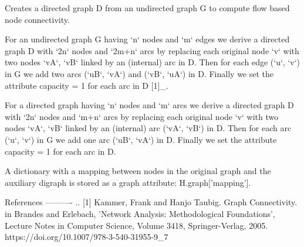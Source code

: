 \begin{DoxyVerb}Creates a directed graph D from an undirected graph G to compute flow
based node connectivity.

For an undirected graph G having `n` nodes and `m` edges we derive a
directed graph D with `2n` nodes and `2m+n` arcs by replacing each
original node `v` with two nodes `vA`, `vB` linked by an (internal)
arc in D. Then for each edge (`u`, `v`) in G we add two arcs (`uB`, `vA`)
and (`vB`, `uA`) in D. Finally we set the attribute capacity = 1 for each
arc in D [1]_.

For a directed graph having `n` nodes and `m` arcs we derive a
directed graph D with `2n` nodes and `m+n` arcs by replacing each
original node `v` with two nodes `vA`, `vB` linked by an (internal)
arc (`vA`, `vB`) in D. Then for each arc (`u`, `v`) in G we add one
arc (`uB`, `vA`) in D. Finally we set the attribute capacity = 1 for
each arc in D.

A dictionary with a mapping between nodes in the original graph and the
auxiliary digraph is stored as a graph attribute: H.graph['mapping'].

References
----------
.. [1] Kammer, Frank and Hanjo Taubig. Graph Connectivity. in Brandes and
    Erlebach, 'Network Analysis: Methodological Foundations', Lecture
    Notes in Computer Science, Volume 3418, Springer-Verlag, 2005.
    https://doi.org/10.1007/978-3-540-31955-9_7\end{DoxyVerb}
 